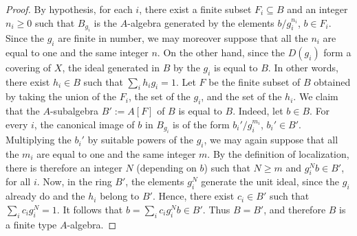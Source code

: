\documentclass{article}
\begin{document}
\begin{proof}
By hypothesis, for each \(i\), there exist a finite subset \(F_i\subseteq B\) and an integer \(n_i\ge 0\) such that \(B_{g_i}\) is the \(A\)-algebra generated by the elements \(b/g_i^{n_i}\), \(b\in F_i\). Since the \(g_i\) are finite in number, we may moreover suppose that all the \(n_i\) are equal to one and the same integer \(n\). On the other hand, since the \(D(g_i)\) form a covering of \(X\), the ideal generated in \(B\) by the \(g_i\) is equal to \(B\). In other words, there exist \(h_i\in B\) such that \(\sum_i h_i g_i=1\). Let \(F\) be the finite subset of \(B\) obtained by taking the union of the \(F_i\), the set of the \(g_i\), and the set of the \(h_i\). We claim that the \(A\)-subalgebra \(B':=A[F]\) of \(B\) is equal to \(B\). Indeed, let \(b\in B\). For every \(i\), the canonical image of \(b\) in \(B_{g_i}\) is of the form \(
b_i'/g_i^{m_i}\), \(b_i'\in B'\). Multiplying the \(b_i'\) by suitable powers of the \(g_i\), we may again suppose that all the \(m_i\) are equal to one and the same integer \(m\). By the definition of localization, there is therefore an integer \(N\) (depending on \(b\)) such that \(N\ge m\) and \(g_i^N b\in B'\), for all \(i\). Now, in the ring \(B'\), the elements \(g_i^N\) generate the unit ideal, since the \(g_i\) already do and the \(h_i\) belong to \(B'\). Hence, there exist \(c_i\in B'\) such that \(\sum_i c_i g_i^N=1\). It follows that \(b=\sum_i c_i g_i^N b\in B'\). Thus \(B=B'\), and therefore \(B\) is a finite type \(A\)-algebra.
\end{proof}
\end{document}

